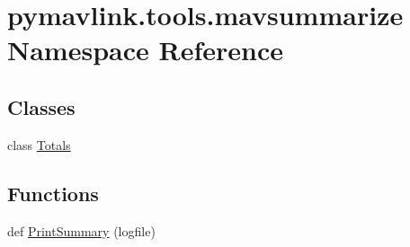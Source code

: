 \hypertarget{namespacepymavlink_1_1tools_1_1mavsummarize}{}\section{pymavlink.\+tools.\+mavsummarize Namespace Reference}
\label{namespacepymavlink_1_1tools_1_1mavsummarize}
\subsection*{Classes}
\begin{DoxyCompactItemize}
\item 
class \hyperlink{classpymavlink_1_1tools_1_1mavsummarize_1_1Totals}{Totals}
\end{DoxyCompactItemize}
\subsection*{Functions}
\begin{DoxyCompactItemize}
\item 
def \hyperlink{namespacepymavlink_1_1tools_1_1mavsummarize_a18c485920e60829977222cc4c514c590}{Print\+Summary} (logfile)
\end{DoxyCompactItemize}

